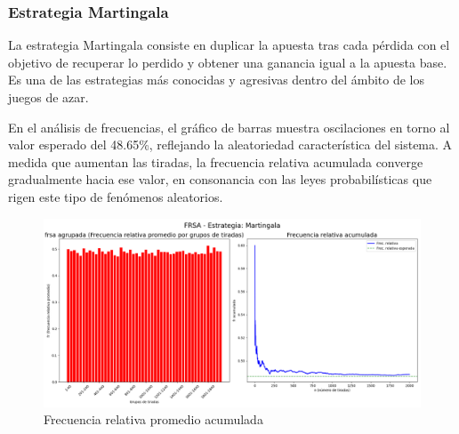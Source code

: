 \documentclass{article}
\begin{document}
\subsubsection{Estrategia Martingala}
La estrategia Martingala consiste en duplicar la apuesta tras cada pérdida con el objetivo de recuperar lo perdido y obtener una ganancia igual a la apuesta base. Es una de las estrategias más conocidas y agresivas dentro del ámbito de los juegos de azar.

En el análisis de frecuencias, el gráfico de barras muestra oscilaciones en torno al valor esperado del 48.65\%, reflejando la aleatoriedad característica del sistema. A medida que aumentan las tiradas, la frecuencia relativa acumulada converge gradualmente hacia ese valor, en consonancia con las leyes probabilísticas que rigen este tipo de fenómenos aleatorios.
\begin{figure}[H]
        \centering
        \includegraphics[width=1\textwidth]{Imagenes/frsa_Martingala.png}
        \caption{Frecuencia relativa promedio acumulada}
        \label{fig:mg_finita}    
    \end{figure}
\end{document}
